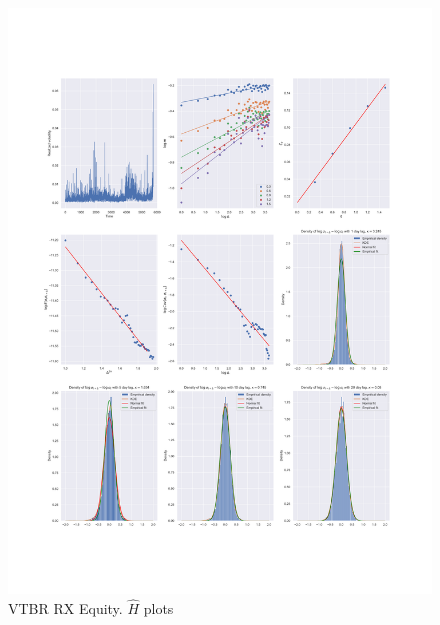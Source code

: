 \begin{figure}[h]
    \centering
    \includegraphics[width=\linewidth]{fig/VTBR RX Equity.pdf}
    \caption{VTBR RX Equity. $\hat{H}$ plots}
\end{figure} 
    
